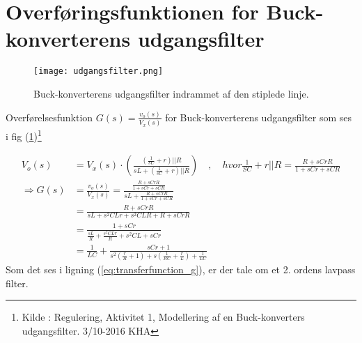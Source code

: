 \section{Overføringsfunktionen for Buck-konverterens udgangsfilter}\label{sec:spm1}
\begin{figure}[h!]
	\centering
	\texttt{[image: udgangsfilter.png]}
	\caption{Buck-konverterens udgangsfilter indrammet af den stiplede linje.}
	\label{fig:udgangsfilter}
\end{figure}
\FloatBlock

Overførelsesfunktion $G(s) = \frac{v_o(s)}{V_x(s)}$ for Buck-konverterens udgangsfilter som ses i fig (\ref{fig:udgangsfilter})\footnote{Kilde : Regulering, Aktivitet 1, Modellering af en Buck-konverters udgangsfilter. 3/10-2016 KHA}

\begin{align}
V_o(s) &= V_x(s) \cdot \left( \frac{\left(\frac{1}{sC} + r \right) || R }{sL + \left(\frac{1}{sC} + r \right) || R}  \right) 
\quad, \quad hvor \frac{1}{SC} + r || R = \frac{R+sCrR}{1+sCr+sCR} \\
\Rightarrow G(s) &= \frac{v_o(s)}{V_x(s)} = \frac{ \frac{R+sCrR}{1+sCr+sCR}}{sL +  \frac{R+sCrR}{1+sCr+sCR}} \\
&= \frac{R+sCrR}{sL+s^2CLr+s^2CLR+R+sCrR}\\
&= \frac{1+sCr}{\frac{sL}{R}+\frac{s^2CLr}{R}+s^2CL+sCr}\\
&= \frac{1}{LC} + \frac{sCr+1}{s^2\left(\frac{r}{R}+1\right)+s\left(\frac{1}{RC}+\frac{r}{L}\right)+\frac{1}{LC}} \label{eq:transferfunction_g}
\end{align}
Som det ses i ligning (\ref{eq:transferfunction_g}), er der tale om et 2. ordens lavpass filter.